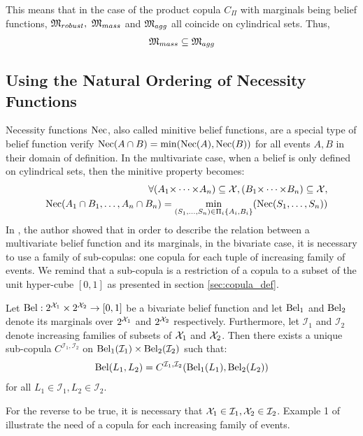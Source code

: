 This means that in the case of the product copula $C_\Pi$ with marginals being belief functions, ${\mathfrak{M}}_{robust},~{\mathfrak{M}}_{mass}$ and ${\mathfrak{M}}_{agg}$ all coincide on cylindrical sets. Thus,
\begin{eqnarray*}
    {\mathfrak{M}}_{mass}\subseteq{\mathfrak{M}}_{agg}
\end{eqnarray*}

\subsection{Using the Natural Ordering of Necessity Functions}\label{subsec:necessity_functions}
Necessity functions ${\mathrm{Nec}}$, also called minitive belief functions, are a special type of belief function verify ${\mathrm{Nec}}(A\cap B) =\min({\mathrm{Nec}}(A), {\mathrm{Nec}}(B))$ for all events $A, B$ in their domain of definition. In the multivariate case, when a belief is only defined on cylindrical sets, then the minitive property becomes:
\begin{eqnarray}
    &&\forall (A_1{\times\dots\times} A_n)\subseteq{\mathcal{X}}, (B_1{\times\dots\times} B_n)\subseteq{\mathcal{X}},\nonumber\\
    &&{\mathrm{Nec}}(A_1\cap B_1,\dots, A_n\cap B_n) = \min_{(S_1,\dots,S_n)\in\Pi_i\{A_i,B_i\}}({\mathrm{Nec}}(S_1, \dots, S_n))
\end{eqnarray}
In \cite{schmelzer_joint_2015}, the author showed that in order to describe the relation between a multivariate belief function and its marginals, in the bivariate case, it is necessary to use a family of sub-copulas: one copula for each tuple of increasing family of events. We remind that a sub-copula is a restriction of a copula to a subset of the unit hyper-cube $[0,1]$ as presented in section \ref{sec:copula_def}.

\begin{theorem}\label{theorem:sklar_belief}
    Let ${\mathrm{Bel}} :2^{{\mathcal{X}}_1}\times2^{{\mathcal{X}}_2}\rightarrow[0,1]$ be a bivariate belief function and let ${\mathrm{Bel}}_1$ and ${\mathrm{Bel}}_2$ denote its marginals over $2^{{\mathcal{X}}_1}$ and $2^{{\mathcal{X}}_2}$ respectively. Furthermore, let $\mathcal{I}_1$ and $\mathcal{I}_2$ denote increasing families of subsets of ${\mathcal{X}}_1$ and ${\mathcal{X}}_2$. Then there exists a unique sub-copula $C^{\mathcal{I}_1,\mathcal{I}_2}$ on  ${\mathrm{Bel}}_1(\mathcal{I}_1)\times {\mathrm{Bel}}_2(\mathcal{I}_2)$ such that:
    \begin{eqnarray}
        {\mathrm{Bel}} (L_1, L_2) = C^{\mathcal{I}_1,\mathcal{I}_2}({\mathrm{Bel}}_1(L_1), {\mathrm{Bel}}_2(L_2))
    \end{eqnarray}
    for all $L_1\in\mathcal{I}_1,L_2\in\mathcal{I}_2$.
\end{theorem}
For the reverse to be true, it is necessary that ${\mathcal{X}}_1\in\mathcal{I}_1, {\mathcal{X}}_2\in\mathcal{I}_2$. Example 1 of \cite{schmelzer_joint_2015} illustrate the need of a copula for each increasing family of events.

